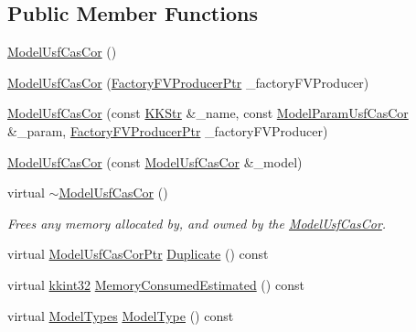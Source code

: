 \subsection*{Public Member Functions}
\begin{DoxyCompactItemize}
\item 
\hyperlink{class_k_k_m_l_l_1_1_model_usf_cas_cor_a6288bd4a4aab962069f54c62e4f68d72}{Model\+Usf\+Cas\+Cor} ()
\item 
\hyperlink{class_k_k_m_l_l_1_1_model_usf_cas_cor_a0e8f9e796e1e48447b14ea9d993470c5}{Model\+Usf\+Cas\+Cor} (\hyperlink{namespace_k_k_m_l_l_a82812d1feb85a6cff72d059bc67bb90e}{Factory\+F\+V\+Producer\+Ptr} \+\_\+factory\+F\+V\+Producer)
\item 
\hyperlink{class_k_k_m_l_l_1_1_model_usf_cas_cor_a7ee9c38b0cf179e15a50c157138b9f26}{Model\+Usf\+Cas\+Cor} (const \hyperlink{class_k_k_b_1_1_k_k_str}{K\+K\+Str} \&\+\_\+name, const \hyperlink{class_k_k_m_l_l_1_1_model_param_usf_cas_cor}{Model\+Param\+Usf\+Cas\+Cor} \&\+\_\+param, \hyperlink{namespace_k_k_m_l_l_a82812d1feb85a6cff72d059bc67bb90e}{Factory\+F\+V\+Producer\+Ptr} \+\_\+factory\+F\+V\+Producer)
\item 
\hyperlink{class_k_k_m_l_l_1_1_model_usf_cas_cor_a0650536e45e904d08ef55777458d98dd}{Model\+Usf\+Cas\+Cor} (const \hyperlink{class_k_k_m_l_l_1_1_model_usf_cas_cor}{Model\+Usf\+Cas\+Cor} \&\+\_\+model)
\item 
virtual \hyperlink{class_k_k_m_l_l_1_1_model_usf_cas_cor_a9292a00c8164a851e000332a2d36d311}{$\sim$\+Model\+Usf\+Cas\+Cor} ()
\begin{DoxyCompactList}\small\item\em Frees any memory allocated by, and owned by the \hyperlink{class_k_k_m_l_l_1_1_model_usf_cas_cor}{Model\+Usf\+Cas\+Cor}. \end{DoxyCompactList}\item 
virtual \hyperlink{class_k_k_m_l_l_1_1_model_usf_cas_cor_a42b54852ed4915fd762eb8c0bb5df39b}{Model\+Usf\+Cas\+Cor\+Ptr} \hyperlink{class_k_k_m_l_l_1_1_model_usf_cas_cor_add2a4278eba48528e048a7eee2e8c577}{Duplicate} () const 
\item 
virtual \hyperlink{namespace_k_k_b_a8fa4952cc84fda1de4bec1fbdd8d5b1b}{kkint32} \hyperlink{class_k_k_m_l_l_1_1_model_usf_cas_cor_a16a86c18f6ffec6817c84ca08d949531}{Memory\+Consumed\+Estimated} () const 
\item 
virtual \hyperlink{class_k_k_m_l_l_1_1_model_aeda4060e088c67446ca993eefcecea06}{Model\+Types} \hyperlink{class_k_k_m_l_l_1_1_model_usf_cas_cor_afd9791b85d1de175ff46fe10eb80b605}{Model\+Type} () const 

\end{DoxyCompactItemize}
